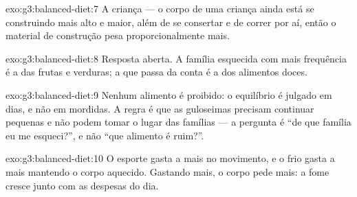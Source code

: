 \begin{solution}{exo:g3:balanced-diet:7}
A criança --- o corpo de uma criança ainda está se construindo mais
alto e maior, além de se consertar e de correr por aí, então o
material de construção pesa proporcionalmente mais.
\end{solution}

\begin{solution}{exo:g3:balanced-diet:8}
Resposta aberta. A família esquecida com mais frequência é a das
frutas e verduras; a que passa da conta é a dos alimentos doces.
\end{solution}

\begin{solution}{exo:g3:balanced-diet:9}
Nenhum alimento é proibido: o equilíbrio é julgado em dias, e não em
mordidas. A regra é que as guloseimas precisam continuar pequenas e
não podem tomar o lugar das famílias --- a pergunta é ``de que
família eu me esqueci?'', e não ``que alimento é ruim?''.
\end{solution}

\begin{solution}{exo:g3:balanced-diet:10}
O esporte gasta  a mais no movimento, e o frio gasta 
a mais mantendo o corpo aquecido. Gastando mais, o corpo pede mais:
a fome cresce junto com as despesas do dia.
\end{solution}
